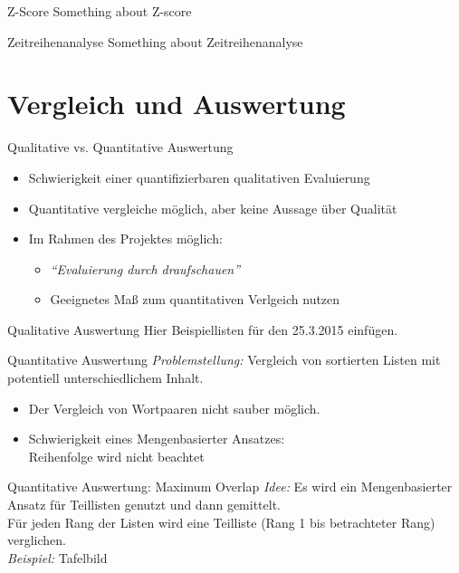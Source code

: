 \documentclass{beamer}
\begin{document}
\begin{frame}{Z-Score}
	Something about Z-score
\end{frame}

\begin{frame}{Zeitreihenanalyse}
	Something about Zeitreihenanalyse
\end{frame}

\section{Vergleich und Auswertung}
\begin{frame} \sectionpage \end{frame}
\begin{frame}{Qualitative vs. Quantitative Auswertung}
	\begin{itemize}
		\item{Schwierigkeit einer quantifizierbaren qualitativen Evaluierung}
		\item{Quantitative vergleiche m\"oglich, aber keine Aussage \"uber Qualit\"at}
		\item{Im Rahmen des Projektes m\"oglich:
			\begin{itemize}
				\item{\emph{``Evaluierung durch draufschauen''}}
				\item{Geeignetes Maß zum quantitativen Verlgeich nutzen}
			\end{itemize}
		}
	\end{itemize}
\end{frame}

\begin{frame}{Qualitative Auswertung}
Hier Beispiellisten f\"ur den 25.3.2015 einf\"ugen.
\end{frame}

\begin{frame}{Quantitative Auswertung}
	\emph{Problemstellung: }Vergleich von sortierten Listen mit potentiell unterschiedlichem Inhalt.
	\begin{itemize}
		\item{Der Vergleich von Wortpaaren nicht sauber m\"oglich.}
		\item{Schwierigkeit eines Mengenbasierter Ansatzes:\\Reihenfolge wird nicht beachtet }
	\end{itemize}	
\end{frame}


\begin{frame}{Quantitative Auswertung: Maximum Overlap}
	\emph{Idee: } Es wird ein Mengenbasierter Ansatz f\"ur Teillisten genutzt und dann gemittelt.\\
	F\"ur jeden Rang der Listen wird eine Teilliste (Rang 1 bis betrachteter Rang) verglichen.\\
	\vspace{1cm}
	\emph{Beispiel:} Tafelbild
\end{frame}
\end{document}
